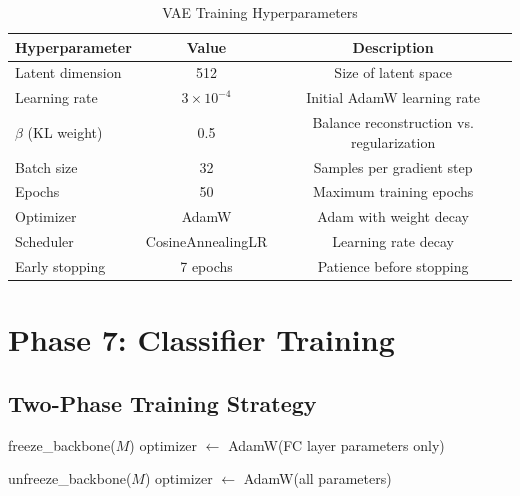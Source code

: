 \documentclass[11pt,a4paper]{article}
\begin{document}
\begin{table}[H]
    \centering
    \caption{VAE Training Hyperparameters}
    \label{tab:vae-hyperparameters}
    \begin{tabular}{lcc}
        \toprule
        \textbf{Hyperparameter} & \textbf{Value} & \textbf{Description} \\
        \midrule
        Latent dimension & 512 & Size of latent space \\
        Learning rate & $3 \times 10^{-4}$ & Initial AdamW learning rate \\
        $\beta$ (KL weight) & 0.5 & Balance reconstruction vs. regularization \\
        Batch size & 32 & Samples per gradient step \\
        Epochs & 50 & Maximum training epochs \\
        Optimizer & AdamW & Adam with weight decay \\
        Scheduler & CosineAnnealingLR & Learning rate decay \\
        Early stopping & 7 epochs & Patience before stopping \\
        \bottomrule
    \end{tabular}
\end{table}

\newpage
\section{Phase 7: Classifier Training}
\label{sec:phase7}

\subsection{Two-Phase Training Strategy}

\begin{algorithm}[H]
    \caption{Classifier Training with Gradual Unfreezing}
    \label{alg:classifier-training}
    \SetAlgoLined

    freeze\_backbone($M$)\;
    optimizer $\leftarrow$ AdamW(FC layer parameters only)\;


    unfreeze\_backbone($M$)\;
    optimizer $\leftarrow$ AdamW(all parameters)\;

\end{algorithm}
\end{document}
